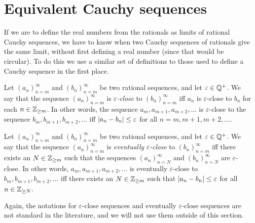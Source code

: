 \section{Equivalent Cauchy sequences}\label{i:sec:5.2}

\begin{note}
  If we are to define the real numbers from the rationals as limits of rational Cauchy sequences, we have to know when two Cauchy sequences of rationals give the same limit, without first defining a real number
  (since that would be circular).
  To do this we use a similar set of definitions to those used to define a Cauchy sequence in the first place.
\end{note}

\begin{defn}\label{i:5.2.1}
  Let \((a_n)_{n = m}^{\infty}\) and \((b_n)_{n = m}^{\infty}\) be two rational sequences, and let \(\varepsilon \in \mathbb{Q}^+\).
  We say that the sequence \((a_n)_{n = m}^{\infty}\) is \emph{\(\varepsilon\)-close} to \((b_n)_{n = m}^{\infty}\) iff \(a_n\) is \(\varepsilon\)-close to \(b_n\) for each \(n \in \mathbb{Z}_{\geq m}\).
  In other words, the sequence \(a_m, a_{m + 1}, a_{m + 2}, \dots\) is \(\varepsilon\)-close to the sequence \(b_m, b_{m + 1}, b_{m + 2}, \dots\) iff \(\left\lvert a_n - b_n\right\rvert \leq \varepsilon\) for all \(n = m, m + 1, m + 2, \dots\).
\end{defn}

\setcounter{thm}{2}
\begin{defn}\label{i:5.2.3}
  Let \((a_n)_{n = m}^{\infty}\) and \((b_n)_{n = m}^{\infty}\) be two rational sequences, and let \(\varepsilon \in \mathbb{Q}^+\).
  We say that the sequence \((a_n)_{n = m}^{\infty}\) is \emph{eventually \(\varepsilon\)-close} to \((b_n)_{n = m}^{\infty}\) iff there exists an \(N \in \mathbb{Z}_{\geq m}\) such that the sequences \((a_n)_{n = N}^{\infty}\) and \((b_n)_{n = N}^{\infty}\) are \(\varepsilon\)-close.
  In other words, \(a_m, a_{m + 1}, a_{m + 2}, \dots\) is eventually \(\varepsilon\)-close to \(b_m, b_{m + 1}, b_{m + 2}, \dots\) iff there exists an \(N \in \mathbb{Z}_{\geq m}\) such that \(\left\lvert a_n - b_n\right\rvert \leq \varepsilon\) for all \(n \in \mathbb{Z}_{\geq N}\).
\end{defn}

\begin{rmk}\label{i:5.2.4}
  Again, the notations for \(\varepsilon\)-close sequences and eventually \(\varepsilon\)-close sequences are not standard in the literature, and we will not use them outside of this section.
\end{rmk}

